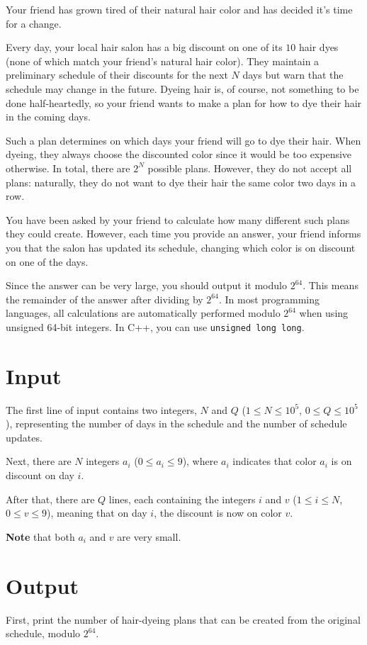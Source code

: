 
Your friend has grown tired of their natural hair color and has decided it's time for a change.

Every day, your local hair salon has a big discount on one of its $10$ hair dyes (none of which
match your friend's natural hair color). They maintain a preliminary schedule of their discounts
for the next $N$ days but warn that the schedule may change in the future. Dyeing hair is, of
course, not something to be done half-heartedly, so your friend wants to make a plan for how to
dye their hair in the coming days.

Such a plan determines on which days your friend will go to dye their hair. When dyeing, they
always choose the discounted color since it would be too expensive otherwise. In total, there
are $2^N$ possible plans. However, they do not accept all plans: naturally, they do not want
to dye their hair the same color two days in a row.

You have been asked by your friend to calculate how many different such plans they could create.
However, each time you provide an answer, your friend informs you that the salon has updated its
schedule, changing which color is on discount on one of the days.

Since the answer can be very large, you should output it modulo $2^{64}$. This means the remainder
of the answer after dividing by $2^{64}$. In most programming languages, all calculations are
automatically performed modulo $2^{64}$ when using unsigned 64-bit integers.
In C++, you can use \texttt{unsigned long long}.

\section*{Input}
The first line of input contains two integers, $N$ and $Q$ ($1 \leq N \leq 10^5$, $0 \leq Q \leq 10^5$),
representing the number of days in the schedule and the number of schedule updates.

Next, there are $N$ integers $a_i$ ($0 \leq a_i \leq 9$), where $a_i$ indicates that color $a_i$ is on
discount on day $i$.

After that, there are $Q$ lines, each containing the integers $i$ and $v$ ($1 \leq i \leq N$, $0 \leq v \leq 9$),
meaning that on day $i$, the discount is now on color $v$.

\textbf{Note} that both $a_i$ and $v$ are very small.

\section*{Output}
First, print the number of hair-dyeing plans that can be created from the original schedule, modulo $2^{64}$.

